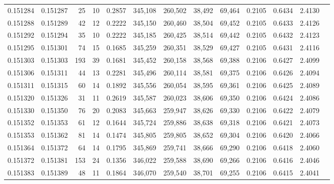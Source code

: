 \begin{tabular}{rrrrrrrrrrrrr}
0.151284 & 0.151287 &    25 &  10 &                                     0.2857 & 345,108 & 260,502 &  38,492 &  69,464 & 0.2105 & 0.6434 & 2.4130 \\
0.151288 & 0.151289 &    42 &  12 &                                     0.2222 & 345,150 & 260,460 &  38,504 &  69,452 & 0.2105 & 0.6433 & 2.4126 \\
0.151292 & 0.151294 &    35 &  10 &                                     0.2222 & 345,185 & 260,425 &  38,514 &  69,442 & 0.2105 & 0.6432 & 2.4123 \\
0.151295 & 0.151301 &    74 &  15 &                                     0.1685 & 345,259 & 260,351 &  38,529 &  69,427 & 0.2105 & 0.6431 & 2.4116 \\
0.151303 & 0.151303 &   193 &  39 &                                     0.1681 & 345,452 & 260,158 &  38,568 &  69,388 & 0.2106 & 0.6427 & 2.4099 \\
0.151306 & 0.151311 &    44 &  13 &                                     0.2281 & 345,496 & 260,114 &  38,581 &  69,375 & 0.2106 & 0.6426 & 2.4094 \\
0.151311 & 0.151315 &    60 &  14 &                                     0.1892 & 345,556 & 260,054 &  38,595 &  69,361 & 0.2106 & 0.6425 & 2.4089 \\
0.151320 & 0.151326 &    31 &  11 &                                     0.2619 & 345,587 & 260,023 &  38,606 &  69,350 & 0.2106 & 0.6424 & 2.4086 \\
0.151330 & 0.151350 &    76 &  20 &                                     0.2083 & 345,663 & 259,947 &  38,626 &  69,330 & 0.2106 & 0.6422 & 2.4079 \\
0.151352 & 0.151353 &    61 &  12 &                                     0.1644 & 345,724 & 259,886 &  38,638 &  69,318 & 0.2106 & 0.6421 & 2.4073 \\
0.151353 & 0.151362 &    81 &  14 &                                     0.1474 & 345,805 & 259,805 &  38,652 &  69,304 & 0.2106 & 0.6420 & 2.4066 \\
0.151364 & 0.151372 &    64 &  14 &                                     0.1795 & 345,869 & 259,741 &  38,666 &  69,290 & 0.2106 & 0.6418 & 2.4060 \\
0.151372 & 0.151381 &   153 &  24 &                                     0.1356 & 346,022 & 259,588 &  38,690 &  69,266 & 0.2106 & 0.6416 & 2.4046 \\
0.151383 & 0.151389 &    48 &  11 &                                     0.1864 & 346,070 & 259,540 &  38,701 &  69,255 & 0.2106 & 0.6415 & 2.4041 \\

\end{tabular}
